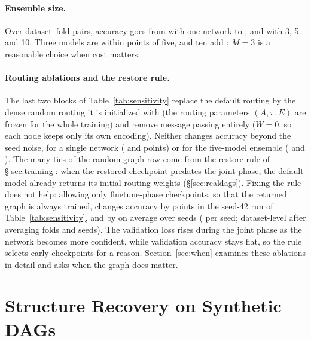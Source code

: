 \documentclass[anon,12pt]{clear2027} %
\begin{document}
\paragraph{Ensemble size.}
Over \SensEnsN{} dataset--fold pairs, accuracy goes from \SensEnsOne{} with one network to \SensEnsThree{}, \SensEnsFive{} and \SensEnsOneZero{} with 3, 5 and 10. Three models are within \SensEnsThreeVsFive{} points of five, and ten add \SensEnsTenVsFive{}: $M=3$ is a reasonable choice when cost matters.

\paragraph{Routing ablations and the restore rule.}
The last two blocks of Table~\ref{tab:sensitivity} replace the default routing by the dense random routing it is initialized with (the routing parameters $(A,\pi,E)$ are frozen for the whole training) and remove message passing entirely ($W=0$, so each node keeps only its own encoding). Neither changes accuracy beyond the seed noise, for a single network (\SensranddagDelta{} and \SensnodagDelta{} points) or for the five-model ensemble (\SensranddagensFiveDelta{} and \SensnodagensFiveDelta{}). The many ties of the random-graph row come from the restore rule of \S\ref{sec:training}: when the restored checkpoint predates the joint phase, the default model already returns its initial routing weights (\S\ref{sec:realdags}). Fixing the rule does not help: allowing only finetune-phase checkpoints, so that the returned graph is always trained, changes accuracy by \SensfixrestoreDelta{} points in the seed-42 run of Table~\ref{tab:sensitivity}, and by \SensFixSeedsDelta{} on average over \SensFixSeedsN{} seeds (\SensFixSeedsPerSeed{} per seed; dataset-level \SensFixSeedsPe{} after averaging folds and seeds). The validation loss rises during the joint phase as the network becomes more confident, while validation accuracy stays flat, so the rule selects early checkpoints for a reason. Section~\ref{sec:when} examines these ablations in detail and asks when the graph does matter.


\section{Structure Recovery on Synthetic DAGs}
\label{sec:synthetic}
\end{document}
